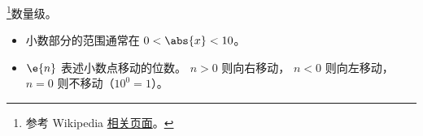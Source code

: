 
\begin{issues}
\issueDraft
\end{issues}

\footnote{参考 Wikipedia \href{https://en.wikipedia.org/wiki/Order_of_magnitude}{相关页面}。}数量级。

\begin{itemize}
\item 小数部分的范围通常在 $0 < \abs{x} < 10$。
\item $\e{n}$ 表述小数点移动的位数。 $n > 0$ 则向右移动， $n < 0$ 则向左移动， $n=0$ 则不移动（$10^{0} = 1$）。
\end{itemize}

